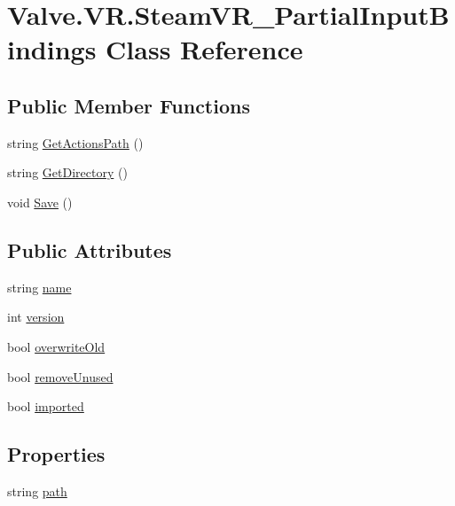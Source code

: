 \hypertarget{class_valve_1_1_v_r_1_1_steam_v_r___partial_input_bindings}{}\section{Valve.\+V\+R.\+Steam\+V\+R\+\_\+\+Partial\+Input\+Bindings Class Reference}
\label{class_valve_1_1_v_r_1_1_steam_v_r___partial_input_bindings}
\subsection*{Public Member Functions}
\begin{DoxyCompactItemize}
\item 
string \mbox{\hyperlink{class_valve_1_1_v_r_1_1_steam_v_r___partial_input_bindings_ac271947867f1c393b35bec64ce44f201}{Get\+Actions\+Path}} ()
\item 
string \mbox{\hyperlink{class_valve_1_1_v_r_1_1_steam_v_r___partial_input_bindings_ae41f3f0d37c80b9a66afc80f2e759038}{Get\+Directory}} ()
\item 
void \mbox{\hyperlink{class_valve_1_1_v_r_1_1_steam_v_r___partial_input_bindings_a25680da3831a2de9a97bcb0af2b351ea}{Save}} ()
\end{DoxyCompactItemize}
\subsection*{Public Attributes}
\begin{DoxyCompactItemize}
\item 
string \mbox{\hyperlink{class_valve_1_1_v_r_1_1_steam_v_r___partial_input_bindings_a873be6e8a716fca954320b0387456ee6}{name}}
\item 
int \mbox{\hyperlink{class_valve_1_1_v_r_1_1_steam_v_r___partial_input_bindings_a2b0da5fab4770d3b7ccce299b2b204ea}{version}}
\item 
bool \mbox{\hyperlink{class_valve_1_1_v_r_1_1_steam_v_r___partial_input_bindings_acd18152c057c7f0683b6fa3452209813}{overwrite\+Old}}
\item 
bool \mbox{\hyperlink{class_valve_1_1_v_r_1_1_steam_v_r___partial_input_bindings_acb28b8a4590ba2065eb2c30ff77454bf}{remove\+Unused}}
\item 
bool \mbox{\hyperlink{class_valve_1_1_v_r_1_1_steam_v_r___partial_input_bindings_a2371306d154bffd13c4e2d69f023e3cd}{imported}}
\end{DoxyCompactItemize}
\subsection*{Properties}
\begin{DoxyCompactItemize}
\item 
string \mbox{\hyperlink{class_valve_1_1_v_r_1_1_steam_v_r___partial_input_bindings_a60dc5f8f20423732fe072d006cb56d16}{path}}
\end{DoxyCompactItemize}



